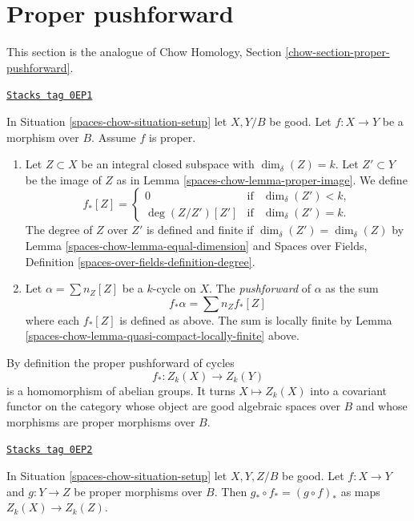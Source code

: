 \section{Proper pushforward}
\label{spaces-chow-section-proper-pushforward}
This section is the analogue of
Chow Homology, Section \ref{chow-section-proper-pushforward}.

\begin{definition}
\label{spaces-chow-definition-proper-pushforward}
\href{https://stacks.math.columbia.edu/tag/0EP1}{\texttt{Stacks tag 0EP1}}

In Situation \ref{spaces-chow-situation-setup} let $X, Y/B$ be good.
Let $f : X \to Y$ be a morphism over $B$.
Assume $f$ is proper.
\begin{enumerate}
\item Let $Z \subset X$ be an integral closed subspace
with $\dim_\delta(Z) = k$. Let $Z' \subset Y$ be the
image of $Z$ as in Lemma \ref{spaces-chow-lemma-proper-image}.
We define
$$
f_*[Z] =
\left\{
\begin{matrix}
0 & \text{if} & \dim_\delta(Z')< k, \\
\deg(Z/Z') [Z'] & \text{if} & \dim_\delta(Z') = k.
\end{matrix}
\right.
$$
The degree of $Z$ over $Z'$ is defined and finite if
$\dim_\delta(Z') = \dim_\delta(Z)$ by Lemma \ref{spaces-chow-lemma-equal-dimension} and
Spaces over Fields, Definition \ref{spaces-over-fields-definition-degree}.
\item Let $\alpha = \sum n_Z [Z]$ be a $k$-cycle on $X$. The
{\it pushforward} of $\alpha$ as the sum
$$
f_* \alpha = \sum n_Z f_*[Z]
$$
where each $f_*[Z]$ is defined as above. The sum is locally finite
by Lemma \ref{spaces-chow-lemma-quasi-compact-locally-finite} above.
\end{enumerate}
\end{definition}

By definition the proper pushforward of cycles
$$
f_* : Z_k(X) \longrightarrow Z_k(Y)
$$
is a homomorphism of abelian groups. It turns $X \mapsto Z_k(X)$
into a covariant functor on the category whose object are good
algebraic spaces over $B$ and whose morphisms are proper morphisms
over $B$.

\begin{lemma}
\label{spaces-chow-lemma-compose-pushforward}
\href{https://stacks.math.columbia.edu/tag/0EP2}{\texttt{Stacks tag 0EP2}}

In Situation \ref{spaces-chow-situation-setup} let $X, Y, Z/B$ be good.
Let $f : X \to Y$ and $g : Y \to Z$ be proper morphisms over $B$.
Then $g_* \circ f_* = (g \circ f)_*$ as maps $Z_k(X) \to Z_k(Z)$.
\end{lemma}

